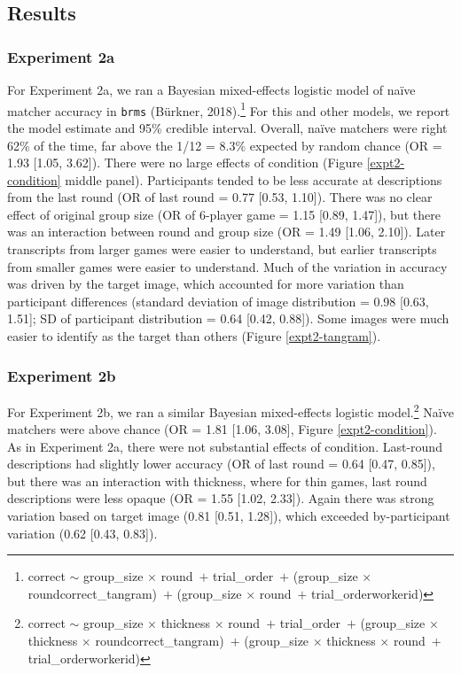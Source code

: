 \documentclass[10pt, letterpaper]{article}
\begin{document}
\subsection{Results}\label{results}

\subsubsection{Experiment 2a}\label{experiment-2a-1}

For Experiment 2a, we ran a Bayesian mixed-effects logistic model of
naïve matcher accuracy in \texttt{brms} (Bürkner, 2018).\footnote{correct
  \({\sim}\) group\_size \({\times}\) round~\({+}\) trial\_order~\({+}\)
  (group\_size \({\times}\) round\textbar correct\_tangram)~\({+}\)
  (group\_size \({\times}\) round~\({+}\) trial\_order\textbar workerid)}
For this and other models, we report the model estimate and 95\%
credible interval. Overall, naïve matchers were right 62\% of the time,
far above the 1/12 = 8.3\% expected by random chance (OR = 1.93 {[}1.05,
3.62{]}). There were no large effects of condition (Figure
\ref{expt2-condition} middle panel). Participants tended to be less
accurate at descriptions from the last round (OR of last round = 0.77
{[}0.53, 1.10{]}). There was no clear effect of original group size (OR
of 6-player game = 1.15 {[}0.89, 1.47{]}), but there was an interaction
between round and group size (OR = 1.49 {[}1.06, 2.10{]}). Later
transcripts from larger games were easier to understand, but earlier
transcripts from smaller games were easier to understand. Much of the
variation in accuracy was driven by the target image, which accounted
for more variation than participant differences (standard deviation of
image distribution = 0.98 {[}0.63, 1.51{]}; SD of participant
distribution = 0.64 {[}0.42, 0.88{]}). Some images were much easier to
identify as the target than others (Figure \ref{expt2-tangram}).

\subsubsection{Experiment 2b}\label{experiment-2b-1}

For Experiment 2b, we ran a similar Bayesian mixed-effects logistic
model.\footnote{correct \({\sim}\) group\_size \({\times}\) thickness
  \({\times}\) round~\({+}\) trial\_order~\({+}\) (group\_size
  \({\times}\) thickness \({\times}\)
  round\textbar correct\_tangram)~\({+}\) (group\_size \({\times}\)
  thickness \({\times}\) round~\({+}\) trial\_order\textbar workerid)}
Naïve matchers were above chance (OR = 1.81 {[}1.06, 3.08{]}, Figure
\ref{expt2-condition}). As in Experiment 2a, there were not substantial
effects of condition. Last-round descriptions had slightly lower
accuracy (OR of last round = 0.64 {[}0.47, 0.85{]}), but there was an
interaction with thickness, where for thin games, last round
descriptions were less opaque (OR = 1.55 {[}1.02, 2.33{]}). Again there
was strong variation based on target image (0.81 {[}0.51, 1.28{]}),
which exceeded by-participant variation (0.62 {[}0.43, 0.83{]}).
\end{document}
